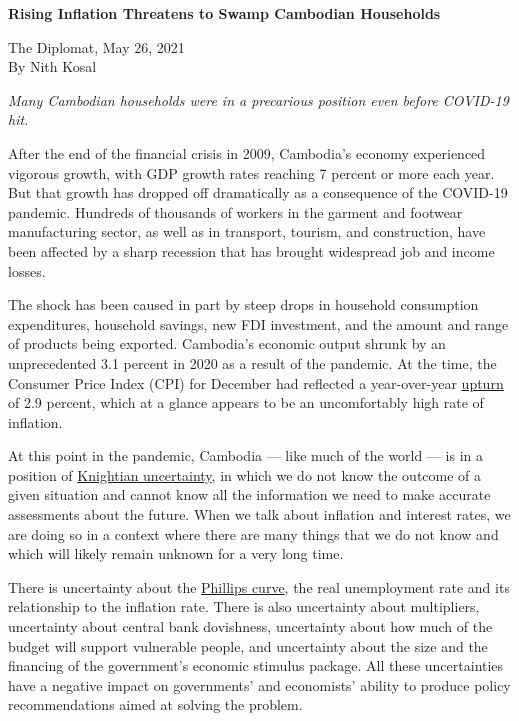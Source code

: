 \documentclass[10pt,a4paper]{letter}
\begin{document}
	
{\Large 
	\textbf{Rising Inflation Threatens to Swamp Cambodian Households}
} 

The Diplomat, May 26, 2021 \\
By Nith Kosal

\textit{Many Cambodian households were in a precarious position even before COVID-19 hit.
}

After the end of the financial crisis in 2009, Cambodia's economy experienced vigorous growth, with GDP growth rates reaching 7 percent or more each year. But that growth has dropped off dramatically as a consequence of the COVID-19 pandemic. Hundreds of thousands of workers in the garment and footwear manufacturing sector, as well as in transport, tourism, and construction, have been affected by a sharp recession that has brought widespread job and income losses.

The shock has been caused in part by steep drops in household consumption expenditures, household savings, new FDI investment, and the amount and range of products being exported. Cambodia's economic output shrunk by an unprecedented 3.1 percent in 2020 as a result of the pandemic. At the time, the Consumer Price Index (CPI) for December had reflected a year-over-year \href{https://www.nis.gov.kh/nis/cpi/2020/PP_CPI%20summary%20table%20Dec%202020.htm}{upturn} of 2.9 percent, which at a glance appears to be an uncomfortably high rate of inflation.

At this point in the pandemic, Cambodia --- like much of the world --- is in a position of \href{https://www.ineteconomics.org/uploads/papers/WP_92-Frydman-et-al-KUH.pdf}{Knightian uncertainty}, in which we do not know the outcome of a given situation and cannot know all the information we need to make accurate assessments about the future. When we talk about inflation and interest rates, we are doing so in a context where there are many things that we do not know and which will likely remain unknown for a very long time.

There is uncertainty about the \href{https://www.econlib.org/library/Enc/PhillipsCurve.html}{Phillips curve}, the real unemployment rate and its relationship to the inflation rate. There is also uncertainty about multipliers, uncertainty about central bank dovishness, uncertainty about how much of the budget will support vulnerable people, and uncertainty about the size and the financing of the government's economic stimulus package. All these uncertainties have a negative impact on governments' and economists' ability to produce policy recommendations aimed at solving the problem.
\end{document}
